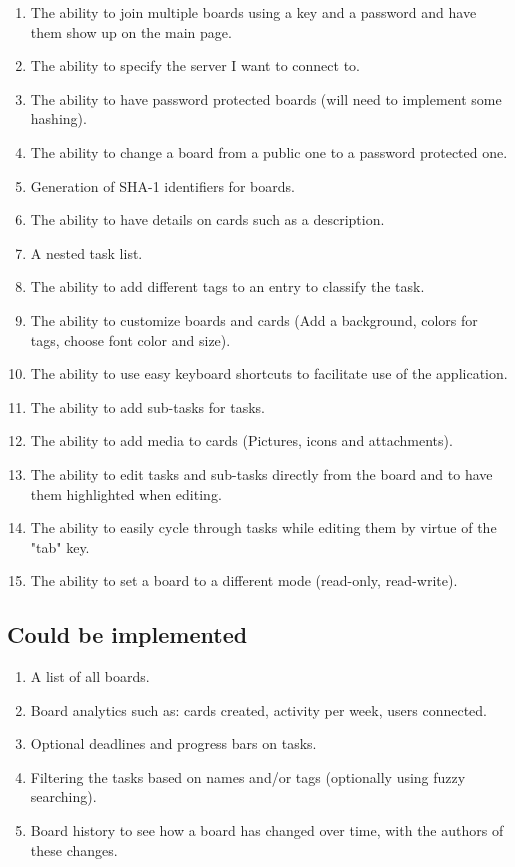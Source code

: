 \documentclass{article}
\begin{document}
	\begin{enumerate}
		\item The ability to join multiple boards using a key and a password and have them show up on the main page.
		\item The ability to specify the server I want to connect to.
		\item The ability to have password protected boards (will need to implement some hashing).
		\item The ability to change a board from a public one to a password protected one.
		\item Generation of SHA-1 identifiers for boards.
		\item The ability to have details on cards such as a description.
		\item A nested task list.
		\item The ability to add different tags to an entry to classify the task.
		\item The ability to customize boards and cards (Add a background, colors for tags, choose font color and size).
		\item The ability to use easy keyboard shortcuts to facilitate use of the application.
		\item The ability to add sub-tasks for tasks.
		\item The ability to add media to cards (Pictures, icons and attachments).
		\item The ability to edit tasks and sub-tasks directly from the board and to have them highlighted when editing.
		\item The ability to easily cycle through tasks while editing them by virtue of the "tab" key.
		\item The ability to set a board to a different mode (read-only, read-write).
	\end{enumerate}

	\subsection{Could be implemented}

	\begin{enumerate}
		\item A list of all boards.
		\item Board analytics such as: cards created, activity per week, users connected.
		\item Optional deadlines and progress bars on tasks.
		\item Filtering the tasks based on names and/or tags (optionally using fuzzy searching).
		\item Board history to see how a board has changed over time, with the authors of these changes.
	\end{enumerate}
\end{document}
